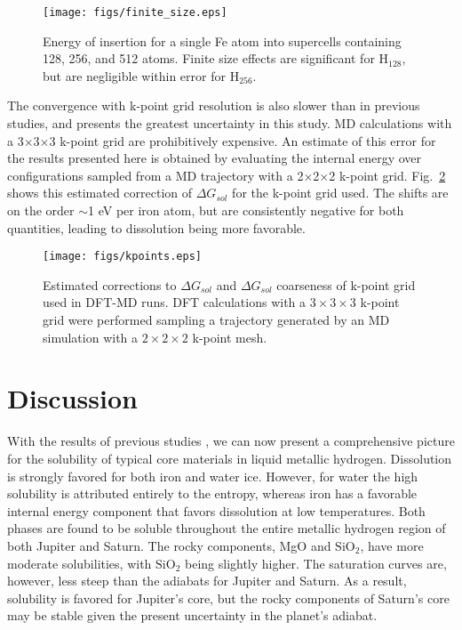  \begin{figure}[H] %
   \centering
   \texttt{[image: figs/finite\_size.eps]} 
\caption{Energy of insertion for a single Fe atom into supercells containing
128, 256, and 512 atoms. Finite size effects are significant
for $\mathrm{H}_{128}$, but are negligible within error for $\mathrm{H}_{256}$. \label{fig:finite_size}}
\end{figure}

The convergence with k-point grid resolution is also slower
than in previous studies, and presents the greatest uncertainty in this study.
MD calculations with a 3$\times$3$\times$3 k-point grid are prohibitively expensive. An
estimate of this error for the results presented here is obtained by
evaluating the internal energy over configurations sampled from a MD
trajectory with a 2$\times$2$\times$2 k-point grid. Fig.~\ref{fig:kpoints} shows this
estimated correction of $\Delta G_{sol}$ for the k-point grid used. 
The shifts are on the order $\sim$1 eV per iron atom, but are
consistently negative for both quantities, leading to dissolution being more favorable. 


 \begin{figure}[!h] %
   \centering
   \texttt{[image: figs/kpoints.eps]} 
\caption{Estimated corrections to $\Delta G_{sol}$ and $\Delta G_{sol}$
coarseness of k-point grid used in DFT-MD runs. DFT calculations with a $3\times
3\times 3$ k-point grid were performed sampling a trajectory generated by an MD
simulation with a $2\times2\times 2$ k-point mesh. \label{fig:kpoints}}
\end{figure}

\section{Discussion}

With the results of previous studies
\citep{Wilson2012a,wilson12b,Gonzalez2013}, we can now present a comprehensive
picture for the solubility of typical core materials in liquid
metallic hydrogen.
Dissolution is strongly favored for both iron and water
ice. However, for water the high solubility is attributed entirely to the
entropy, whereas iron has a favorable internal energy component that favors
dissolution at low temperatures.
Both phases are found to be soluble throughout the entire metallic
hydrogen region of both Jupiter and Saturn. The rocky components, MgO and
$\mathrm{SiO}_2$, have more moderate solubilities, with $\mathrm{SiO}_2$ being slightly higher. The saturation
curves are, however, less steep than the adiabats for Jupiter and Saturn. As a
result, solubility is favored for Jupiter's core, but the rocky components of
Saturn's core may be stable given the present uncertainty in the planet's
adiabat.

